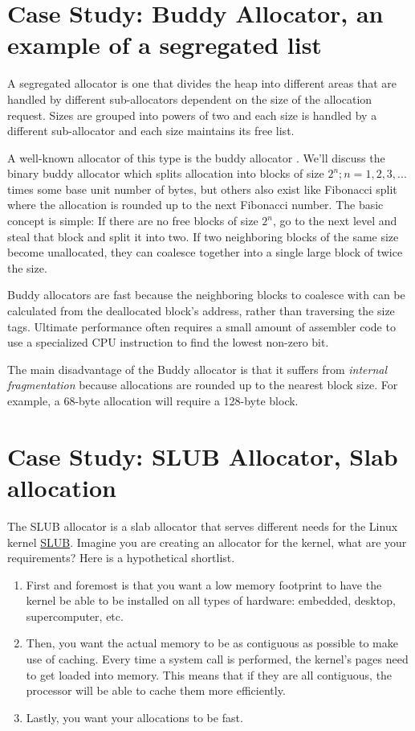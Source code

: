 \section{Case Study: Buddy Allocator, an example of a segregated list}

A segregated allocator is one that divides the heap into different areas that are handled by different sub-allocators dependent on the size of the allocation request.
Sizes are grouped into powers of two and each size is handled by a different sub-allocator and each size maintains its free list.

A well-known allocator of this type is the buddy allocator \cite[P. 85]{rangan1999foundations}.
We'll discuss the binary buddy allocator which splits allocation into blocks of size $2^n; n = 1, 2, 3, ...$ times some base unit number of bytes, but others also exist like Fibonacci split where the allocation is rounded up to the next Fibonacci number.
The basic concept is simple: If there are no free blocks of size $2^n$, go to the next level and steal that block and split it into two.
If two neighboring blocks of the same size become unallocated, they can coalesce together into a single large block of twice the size.

Buddy allocators are fast because the neighboring blocks to coalesce with can be calculated from the deallocated block's address, rather than traversing the size tags.
Ultimate performance often requires a small amount of assembler code to use a specialized CPU instruction to find the lowest non-zero bit.

The main disadvantage of the Buddy allocator is that it suffers from \emph{internal fragmentation} because allocations are rounded up to the nearest block size.
For example, a 68-byte allocation will require a 128-byte block.

\section{Case Study: SLUB Allocator, Slab allocation}

The SLUB allocator is a slab allocator that serves different needs for the Linux kernel \href{http://en.wikipedia.org/wiki/SLUB_\%28software\%29}{SLUB}.
Imagine you are creating an allocator for the kernel, what are your requirements?
Here is a hypothetical shortlist.

\begin{enumerate}
\item First and foremost is that you want a low memory footprint to have the kernel be able to be installed on all types of hardware: embedded, desktop, supercomputer, etc.
\item Then, you want the actual memory to be as contiguous as possible to make use of caching. Every time a system call is performed, the kernel's pages need to get loaded into memory. This means that if they are all contiguous, the processor will be able to cache them more efficiently.
\item Lastly, you want your allocations to be fast.
\end{enumerate}

